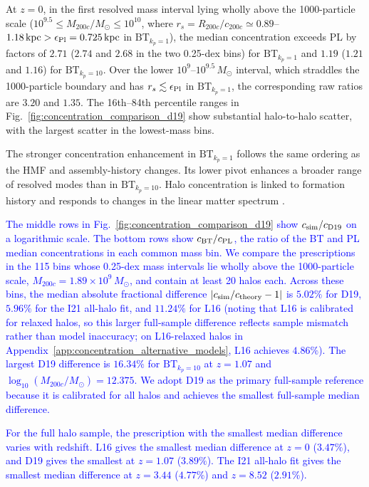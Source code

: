 \documentclass[
 reprint,
 superscriptaddress,
 nofootinbib,
 nobibnotes,
 amsmath,
 amssymb,
 aps,
 prd,
 floatfix,
 longbibliography
]{revtex4-2}
\DeclareRobustCommand{\change}[1]{\textcolor{blue}{#1}}
\DeclareRobustCommand{\BTKPone}{\ensuremath{\mathrm{BT}_{k_p=1}}}
\DeclareRobustCommand{\BTKPten}{\ensuremath{\mathrm{BT}_{k_p=10}}}
\begin{document}
At \(z=0\), in the first resolved mass interval lying wholly above the 1000-particle scale (\(10^{9.5}\le M_{200c}/M_\odot\le10^{10}\), where \(r_s=R_{200c}/c_{200c}\simeq0.89\)--\(1.18\,{\rm kpc}>\epsilon_{\rm Pl}=0.725\,{\rm kpc}\) in \BTKPone{}), the median concentration exceeds PL by factors of \(2.71\) (\(2.74\) and \(2.68\) in the two 0.25-dex bins) for \BTKPone{} and \(1.19\) (\(1.21\) and \(1.16\)) for \BTKPten{}. Over the lower \(10^9\)--\(10^{9.5}\,M_\odot\) interval, which straddles the 1000-particle boundary and has \(r_s\lesssim\epsilon_{\rm Pl}\) in \BTKPone{}, the corresponding raw ratios are \(3.20\) and \(1.35\). The 16th--84th percentile ranges in Fig.~\ref{fig:concentration_comparison_d19} show substantial halo-to-halo scatter, with the largest scatter in the lowest-mass bins.


The stronger concentration enhancement in \BTKPone{} follows the same ordering as the HMF and assembly-history changes. Its lower pivot enhances a broader range of resolved modes than in \BTKPten{}. Halo concentration is linked to formation history and responds to changes in the linear matter spectrum \citep{Ludlow2016WDMConcentration,Brown2020HaloPPS}.


\change{The middle rows in Fig.~\ref{fig:concentration_comparison_d19} show \(c_{\rm sim}/c_{\rm D19}\) on a logarithmic scale. The bottom rows show \(c_{\rm BT}/c_{\rm PL}\), the ratio of the BT and PL median concentrations in each common mass bin.} \change{We compare the prescriptions in the 115 bins whose 0.25-dex mass intervals lie wholly above the 1000-particle scale, \(M_{200c}=1.89\times10^9\,M_\odot\), and contain at least 20 halos each. Across these bins, the median absolute fractional difference \(\lvert c_{\rm sim}/c_{\rm theory}-1\rvert\) is \(5.02\%\) for D19, \(5.96\%\) for the I21 all-halo fit, and \(11.24\%\) for L16 (noting that L16 is calibrated for relaxed halos, so this larger full-sample difference reflects sample mismatch rather than model inaccuracy; on L16-relaxed halos in Appendix~\ref{app:concentration_alternative_models}, L16 achieves \(4.86\%\)). The largest D19 difference is \(16.34\%\) for \BTKPten{} at \(z=1.07\) and \(\log_{10}(M_{200c}/M_\odot)=12.375\). We adopt D19 as the primary full-sample reference because it is calibrated for all halos and achieves the smallest full-sample median difference.}

\change{For the full halo sample, the prescription with the smallest median difference varies with redshift. L16 gives the smallest median difference at \(z=0\) (\(3.47\%\)), and D19 gives the smallest at \(z=1.07\) (\(3.89\%\)). The I21 all-halo fit gives the smallest median difference at \(z=3.44\) (\(4.77\%\)) and \(z=8.52\) (\(2.91\%\)).}
\end{document}
